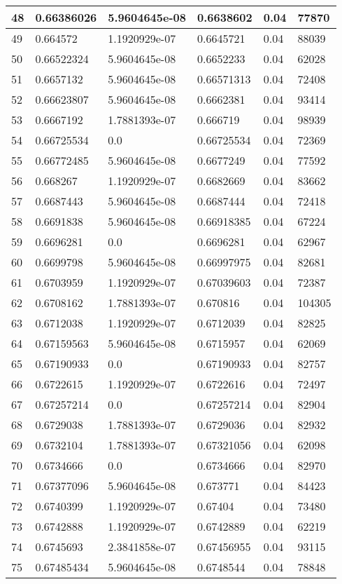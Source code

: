 \begin{longtable}{|l|l|l|l|l|l|}
48 & 0.66386026 & 5.9604645e-08 & 0.6638602 & 0.04 & 77870 \\ \hline 
49 & 0.664572 & 1.1920929e-07 & 0.6645721 & 0.04 & 88039 \\ \hline 
50 & 0.66522324 & 5.9604645e-08 & 0.6652233 & 0.04 & 62028 \\ \hline 
51 & 0.6657132 & 5.9604645e-08 & 0.66571313 & 0.04 & 72408 \\ \hline 
52 & 0.66623807 & 5.9604645e-08 & 0.6662381 & 0.04 & 93414 \\ \hline 
53 & 0.6667192 & 1.7881393e-07 & 0.666719 & 0.04 & 98939 \\ \hline 
54 & 0.66725534 & 0.0 & 0.66725534 & 0.04 & 72369 \\ \hline 
55 & 0.66772485 & 5.9604645e-08 & 0.6677249 & 0.04 & 77592 \\ \hline 
56 & 0.668267 & 1.1920929e-07 & 0.6682669 & 0.04 & 83662 \\ \hline 
57 & 0.6687443 & 5.9604645e-08 & 0.6687444 & 0.04 & 72418 \\ \hline 
58 & 0.6691838 & 5.9604645e-08 & 0.66918385 & 0.04 & 67224 \\ \hline 
59 & 0.6696281 & 0.0 & 0.6696281 & 0.04 & 62967 \\ \hline 
60 & 0.6699798 & 5.9604645e-08 & 0.66997975 & 0.04 & 82681 \\ \hline 
61 & 0.6703959 & 1.1920929e-07 & 0.67039603 & 0.04 & 72387 \\ \hline 
62 & 0.6708162 & 1.7881393e-07 & 0.670816 & 0.04 & 104305 \\ \hline 
63 & 0.6712038 & 1.1920929e-07 & 0.6712039 & 0.04 & 82825 \\ \hline 
64 & 0.67159563 & 5.9604645e-08 & 0.6715957 & 0.04 & 62069 \\ \hline 
65 & 0.67190933 & 0.0 & 0.67190933 & 0.04 & 82757 \\ \hline 
66 & 0.6722615 & 1.1920929e-07 & 0.6722616 & 0.04 & 72497 \\ \hline 
67 & 0.67257214 & 0.0 & 0.67257214 & 0.04 & 82904 \\ \hline 
68 & 0.6729038 & 1.7881393e-07 & 0.6729036 & 0.04 & 82932 \\ \hline 
69 & 0.6732104 & 1.7881393e-07 & 0.67321056 & 0.04 & 62098 \\ \hline 
70 & 0.6734666 & 0.0 & 0.6734666 & 0.04 & 82970 \\ \hline 
71 & 0.67377096 & 5.9604645e-08 & 0.673771 & 0.04 & 84423 \\ \hline 
72 & 0.6740399 & 1.1920929e-07 & 0.67404 & 0.04 & 73480 \\ \hline 
73 & 0.6742888 & 1.1920929e-07 & 0.6742889 & 0.04 & 62219 \\ \hline 
74 & 0.6745693 & 2.3841858e-07 & 0.67456955 & 0.04 & 93115 \\ \hline 
75 & 0.67485434 & 5.9604645e-08 & 0.6748544 & 0.04 & 78848 \\ \hline 
\end{longtable}